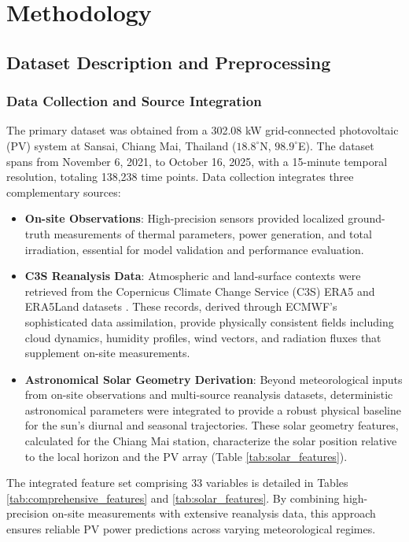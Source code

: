 \documentclass[conference]{IEEEtran}
\begin{document}
	\section{Methodology}
	
	\subsection{Dataset Description and Preprocessing}
	
	\subsubsection{\textbf{Data Collection and Source Integration}}
	The primary dataset was obtained from a 302.08 kW grid-connected photovoltaic (PV) system at Sansai, Chiang Mai, Thailand ($18.8^\circ$N, $98.9^\circ$E). The dataset spans from November 6, 2021, to October 16, 2025, with a 15-minute temporal resolution, totaling 138,238 time points. Data collection integrates three complementary sources:
	
	\begin{itemize} 
		\item \textbf{On-site Observations}: High-precision sensors provided localized ground-truth measurements of thermal parameters, power generation, and total irradiation, essential for model validation and performance evaluation. 
		\item \textbf{C3S Reanalysis Data}: Atmospheric and land-surface contexts were retrieved from the Copernicus Climate Change Service (C3S) ERA5 and ERA5Land datasets \cite{Copernicus2023, Hersbach2023, CopernicusLand2019, MunozSabater2019}. These records, derived through ECMWF's sophisticated data assimilation, provide physically consistent fields including cloud dynamics, humidity profiles, wind vectors, and radiation fluxes that supplement on-site measurements. 
		\item \textbf{Astronomical Solar Geometry Derivation}: Beyond meteorological inputs from on-site observations and multi-source reanalysis datasets, deterministic astronomical parameters were integrated to provide a robust physical baseline for the sun’s diurnal and seasonal trajectories. These solar geometry features, calculated for the Chiang Mai station, characterize the solar position relative to the local horizon and the PV array (Table \ref{tab:solar_features}).
	\end{itemize}
	
	The integrated feature set comprising 33 variables is detailed in Tables \ref{tab:comprehensive_features} and \ref{tab:solar_features}. By combining high-precision on-site measurements with extensive reanalysis data, this approach ensures reliable PV power predictions across varying meteorological regimes.
		
\end{document}
